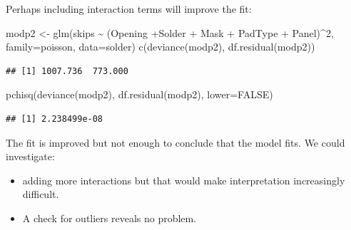 \documentclass[
  ignorenonframetext,
]{beamer}
\newenvironment{Shaded}{\begin{snugshade}}{\end{snugshade}}
\newcommand{\AttributeTok}[1]{\textcolor[rgb]{0.77,0.63,0.00}{#1}}
\newcommand{\ConstantTok}[1]{\textcolor[rgb]{0.00,0.00,0.00}{#1}}
\newcommand{\DecValTok}[1]{\textcolor[rgb]{0.00,0.00,0.81}{#1}}
\newcommand{\FunctionTok}[1]{\textcolor[rgb]{0.00,0.00,0.00}{#1}}
\newcommand{\NormalTok}[1]{#1}
\newcommand{\OtherTok}[1]{\textcolor[rgb]{0.56,0.35,0.01}{#1}}
\newcommand{\SpecialCharTok}[1]{\textcolor[rgb]{0.00,0.00,0.00}{#1}}
\providecommand{\tightlist}{%
  \setlength{\itemsep}{0pt}\setlength{\parskip}{0pt}}
\begin{document}
\begin{frame}[fragile]{}
\protect\hypertarget{section-32}{}
Perhaps including interaction terms will improve the fit:

\vspace{12pt}
\tiny

\begin{Shaded}
\begin{Highlighting}[]
\NormalTok{modp2 }\OtherTok{\textless{}{-}} \FunctionTok{glm}\NormalTok{(skips }\SpecialCharTok{\textasciitilde{}}\NormalTok{ (Opening }\SpecialCharTok{+}\NormalTok{Solder }\SpecialCharTok{+}\NormalTok{ Mask }\SpecialCharTok{+}\NormalTok{ PadType }\SpecialCharTok{+}\NormalTok{ Panel)}\SpecialCharTok{\^{}}\DecValTok{2}\NormalTok{, }
             \AttributeTok{family=}\NormalTok{poisson, }\AttributeTok{data=}\NormalTok{solder)}
\FunctionTok{c}\NormalTok{(}\FunctionTok{deviance}\NormalTok{(modp2), }\FunctionTok{df.residual}\NormalTok{(modp2))}
\end{Highlighting}
\end{Shaded}

\begin{verbatim}
## [1] 1007.736  773.000
\end{verbatim}

\begin{Shaded}
\begin{Highlighting}[]
\FunctionTok{pchisq}\NormalTok{(}\FunctionTok{deviance}\NormalTok{(modp2), }\FunctionTok{df.residual}\NormalTok{(modp2), }\AttributeTok{lower=}\ConstantTok{FALSE}\NormalTok{)}
\end{Highlighting}
\end{Shaded}

\begin{verbatim}
## [1] 2.238499e-08
\end{verbatim}

\vspace{12pt}
\normalsize

The fit is improved but not enough to conclude that the model fits. We
could investigate:

\begin{itemize}
\tightlist
\item
  adding more interactions but that would make interpretation
  increasingly difficult.
\item
  A check for outliers reveals no problem.
\end{itemize}
\end{frame}
\end{document}
